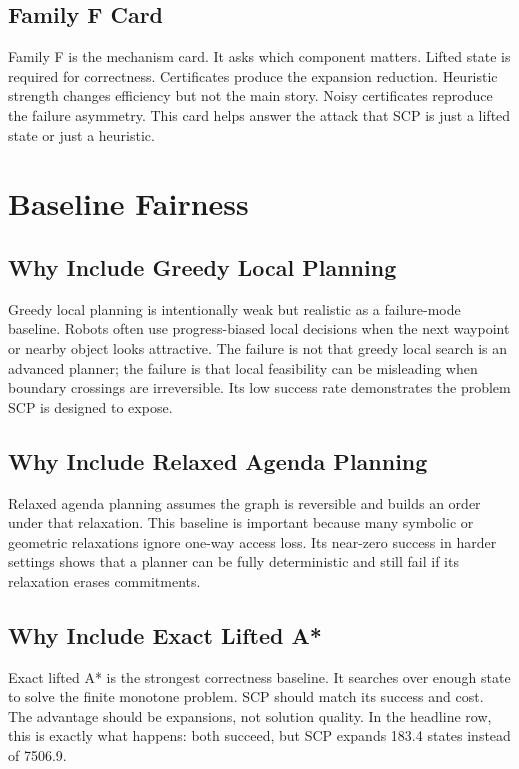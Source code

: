 \documentclass{article}
\begin{document}
\subsection{Family F Card}

Family F is the mechanism card. It asks which component matters. Lifted state is required for correctness. Certificates produce the expansion reduction. Heuristic strength changes efficiency but not the main story. Noisy certificates reproduce the failure asymmetry. This card helps answer the attack that SCP is just a lifted state or just a heuristic.

\section{Baseline Fairness}

\subsection{Why Include Greedy Local Planning}

Greedy local planning is intentionally weak but realistic as a failure-mode baseline. Robots often use progress-biased local decisions when the next waypoint or nearby object looks attractive. The failure is not that greedy local search is an advanced planner; the failure is that local feasibility can be misleading when boundary crossings are irreversible. Its low success rate demonstrates the problem SCP is designed to expose.

\subsection{Why Include Relaxed Agenda Planning}

Relaxed agenda planning assumes the graph is reversible and builds an order under that relaxation. This baseline is important because many symbolic or geometric relaxations ignore one-way access loss. Its near-zero success in harder settings shows that a planner can be fully deterministic and still fail if its relaxation erases commitments.

\subsection{Why Include Exact Lifted A*}

Exact lifted A* is the strongest correctness baseline. It searches over enough state to solve the finite monotone problem. SCP should match its success and cost. The advantage should be expansions, not solution quality. In the headline row, this is exactly what happens: both succeed, but SCP expands 183.4 states instead of 7506.9.
\end{document}
